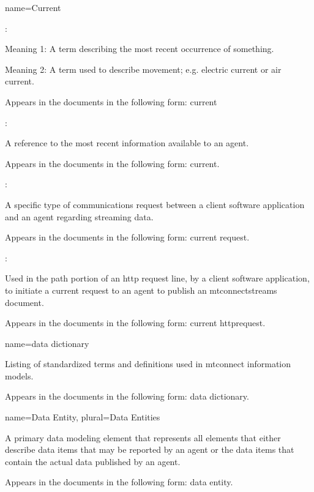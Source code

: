 {
  name={Current}
}
{
	:

	Meaning 1:  A term describing the most recent occurrence of something.

	Meaning 2:  A term used to describe movement; e.g. electric current or air current.

	Appears in the documents in the following form: current

	:

	A reference to the most recent information available to an \gls{agent}.

	Appears in the documents in the following form: current.

	:

	A specific type of communications request between a client software application and an \gls{agent} regarding \gls{streaming data}.  

	Appears in the documents in the following form: \gls{current request}.

	:

	Used in the path portion of an \gls{http request line}, by a client software application, to initiate a \gls{current request} to an \gls{agent} to publish an \glspl{mtconnectstream} document.

	Appears in the documents in the following form: \gls{current httprequest}.
}


{
  name={data dictionary}
}
{
	Listing of standardized terms and definitions used in \glspl{mtconnect information model}.

	Appears in the documents in the following form: \gls{data dictionary}.
}


{
  name={Data Entity},
  plural={Data Entities}
}
{
	A primary data modeling element that represents all elements that either describe data items that may be reported by an \gls{agent} or the data items that contain the actual data published by an \gls{agent}.

	Appears in the documents in the following form: \gls{data entity}.
}


